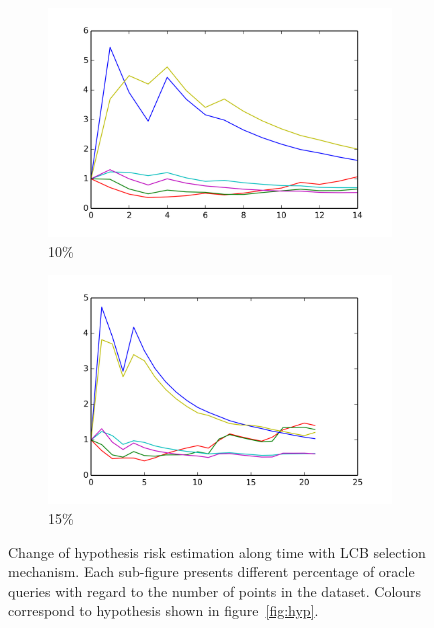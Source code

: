 \documentclass[12pt, a4paper, pdflatex, leqno]{report}
\begin{document}
\begin{figure}[htbp]
    \begin{subfigure}{.5\linewidth}\centering
    \includegraphics[width=1.1\textwidth]{graphics/convergence_LCB010.png}
    \caption{10\%\label{fig:LCB_conv.ALL:10}}
  \end{subfigure}
  \begin{subfigure}{.5\linewidth}\centering
    \includegraphics[width=1.1\textwidth]{graphics/convergence_LCB015.png}
    \caption{15\%\label{fig:LCB_conv.ALL:15}}
  \end{subfigure}

  \caption{Change of hypothesis risk estimation along time with LCB selection mechanism. Each sub-figure presents different percentage of oracle queries with regard to the number of points in the dataset. Colours correspond to hypothesis shown in figure~\ref{fig:hyp}.\label{fig:LCB_conv.ALL}}
\end{figure}
\end{document}
